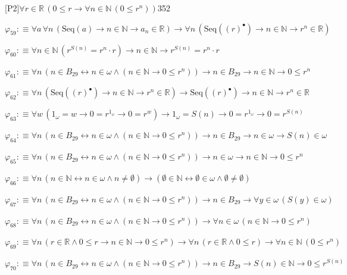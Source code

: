 \begin{fullproof}{[P2]}{$\forall r \in \mathbb{R}\,(0 \leq r \to \forall n \in \mathbb{N}\,(0 \leq {{r}^{n}}))$}{352}
\begin{abbrevlist}
\item $\varphi_{59} :\equiv \forall a\,\forall n\,(\mathrm{Seq}(a) \to n \in \mathbb{N} \to a_{n} \in \mathbb{R}) \to \forall n\,(\mathrm{Seq}({(r)^{\bullet}}) \to n \in \mathbb{N} \to {{r}^{n}} \in \mathbb{R})$
\item $\varphi_{60} :\equiv \forall n \in \mathbb{N}\,({{r}^{S(n)}} = {{r}^{n}} \cdot r) \to n \in \mathbb{N} \to {{r}^{S(n)}} = {{r}^{n}} \cdot r$
\item $\varphi_{61} :\equiv \forall n\,(n \in B_{29} \leftrightarrow n \in \omega \land (n \in \mathbb{N} \to 0 \leq {{r}^{n}})) \to n \in B_{29} \to n \in \mathbb{N} \to 0 \leq {{r}^{n}}$
\item $\varphi_{62} :\equiv \forall n\,(\mathrm{Seq}({(r)^{\bullet}}) \to n \in \mathbb{N} \to {{r}^{n}} \in \mathbb{R}) \to \mathrm{Seq}({(r)^{\bullet}}) \to n \in \mathbb{N} \to {{r}^{n}} \in \mathbb{R}$
\item $\varphi_{63} :\equiv \forall w\,(1_{\omega} = w \to 0 = {{r}^{1_{\omega}}} \to 0 = {{r}^{w}}) \to 1_{\omega} = S(n) \to 0 = {{r}^{1_{\omega}}} \to 0 = {{r}^{S(n)}}$
\item $\varphi_{64} :\equiv \forall n\,(n \in B_{29} \leftrightarrow n \in \omega \land (n \in \mathbb{N} \to 0 \leq {{r}^{n}})) \to n \in B_{29} \to n \in \omega \to S(n) \in \omega$
\item $\varphi_{65} :\equiv \forall n\,(n \in B_{29} \leftrightarrow n \in \omega \land (n \in \mathbb{N} \to 0 \leq {{r}^{n}})) \to n \in \omega \to n \in \mathbb{N} \to 0 \leq {{r}^{n}}$
\item $\varphi_{66} :\equiv \forall n\,(n \in \mathbb{N} \leftrightarrow n \in \omega \land n \neq \emptyset) \to (\emptyset \in \mathbb{N} \leftrightarrow \emptyset \in \omega \land \emptyset \neq \emptyset)$
\item $\varphi_{67} :\equiv \forall n\,(n \in B_{29} \leftrightarrow n \in \omega \land (n \in \mathbb{N} \to 0 \leq {{r}^{n}})) \to n \in B_{29} \to \forall y \in \omega\,(S(y) \in \omega)$
\item $\varphi_{68} :\equiv \forall n\,(n \in B_{29} \leftrightarrow n \in \omega \land (n \in \mathbb{N} \to 0 \leq {{r}^{n}})) \to \forall n \in \omega\,(n \in \mathbb{N} \to 0 \leq {{r}^{n}})$
\item $\varphi_{69} :\equiv \forall n\,(r \in \mathbb{R} \land 0 \leq r \to n \in \mathbb{N} \to 0 \leq {{r}^{n}}) \to \forall n\,(r \in \mathbb{R} \land 0 \leq r) \to \forall n \in \mathbb{N}\,(0 \leq {{r}^{n}})$
\item $\varphi_{70} :\equiv \forall n\,(n \in B_{29} \leftrightarrow n \in \omega \land (n \in \mathbb{N} \to 0 \leq {{r}^{n}})) \to n \in B_{29} \to S(n) \in \mathbb{N} \to 0 \leq {{r}^{S(n)}}$

\end{abbrevlist}
\end{fullproof}

